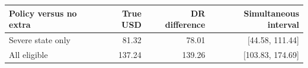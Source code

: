 \begin{tabular}{@{}lrrr@{}}
\toprule
Policy versus no extra & True USD & DR difference & Simultaneous interval\\
\midrule
Severe state only & 81.32 & 78.01 & [44.58, 111.44]\\
All eligible & 137.24 & 139.26 & [103.83, 174.69]\\
\bottomrule
\end{tabular}

